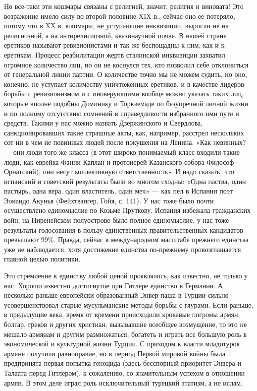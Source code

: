 Но  все-таки  эти  кошмары  связаны  с  религией,  значит,  религия  и
виновата! Это возражение имело силу  во второй половине XIX в., сейчас
оно ее потеряло, потому что в XX в. кошмары, не уступающие инквизиции,
выросли не на религиозной, а на антирелигиозной, квазинаучной почве. В
нашей  стране еретиков  называют  ревизионистами и  так же  беспощадны
к  ним,  как  и  к еретикам.  Процесс  реабилитации  жертв  сталинской
инквизиции  захватил  огромное  количество  лиц,  но  он  не  коснулся
тех,  кто позволил  себе отклониться  от генеральной  линии партии.  О
количестве  точно мы  не можем  судить, но  оно, конечно,  не уступает
количеству  уничтоженных  еретиков,  и  в качестве  лидеров  борьбы  с
ревизионизмом и с иноверующими вообще можно указать таких лиц, которые
вполне подобны Доминику и Торквемаде  по безупречной личной жизни и по
полному  отсутствию  сомнений  в справедливости  избранного  ими  пути
и  средств.  Такими у  нас  можно  назвать Дзержинского  и  Свердлова,
санкционировавших  такие   страшные  акты,  как,   например,  расстрел
нескольких сот ни  в чем не повинных людей после  покушения на Ленина.
«Как невинных? ---  они люди того же класса (в  этот широко понимаемый
класс  входили  такие люди,  как  еврейка  Фанни Каплан  и  протоиерей
Казанского   собора  Философ   Орнатский),   они  несут   коллективную
ответственность». И надо сказать, что испанский и советский результаты
были во  многом сходны:  «Одна паства, один  пастырь, одна  вера, один
властитель,  один меч»  ---  как  пел в  Испании  поэт Эонандо  Акунья
(Фейхтвангер,  Гойя,  с. 141).  У  нас  тоже было  почти  осуществлено
единомыслие по Козьме Пруткову.  Испания избежала гражданских войн, на
Пиренейском полуострове было полное единомыслие, у нас тоже результаты
голосования   в  пользу   единственных  правительственных   кандидатов
превышают  99\%.  Правда,  сейчас в  международном  масштабе  прежнего
единства  уже не  наблюдается,  хотя  достижение единства  по-прежнему
провозглашается главной целью политики.

Это стремление  к единству любой  ценой проявлялось, как  известно, не
только  у нас.  Хорошо  известно достигнутое  при  Гитлере единство  в
Германии.  А несколько  раньше  европейски  образованный Энвер-паша  в
Турции сильно  усовершенствовал старые  мусульманские методы  борьбы с
гяурами. Если раньше, в предыдущие  века, время от времени происходили
кровавые погромы  армян, болгар, греков и  других христиан, вызывавшие
всеобщее возмущение, то  это не мешало армянам  и другим размножаться,
богатеть и играть все большую  роль в экономической и культурной жизни
Турции. С приходом к власти младотурок армяне получили равноправие, но
в период Первой мировой войны была предпринята первая попытка геноцида
(здесь  бесспорный  приоритет  Энвера  и Талаата  перед  Гитлером),  к
сожалению,  со значительным  успехом в  отношении армян.  В этом  деле
играл роль исключительный турецкий этатизм, а не ислам.

